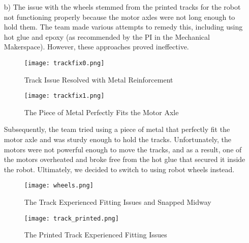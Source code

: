 \documentclass[12pt]{article}
\begin{document}
\begin{itemize}
\begin{itemize}
\begin{itemize}
\begin{enumerate}
                \item[b)] The issue with the wheels stemmed from the printed tracks for the robot not functioning properly because the motor axles were not long enough to hold them. The team made various attempts to remedy this, including using hot glue and epoxy (as recommended by the PI in the Mechanical Makerspace). However, these approaches proved ineffective.
                \begin{figure}[H]
                    \centering
                    \begin{minipage}[t]{0.45\textwidth}
                        \centering
                        \texttt{[image: trackfix0.png]}
                        \caption{Track Issue Resolved with Metal Reinforcement}
                        \label{fig:trackfix0}
                    \end{minipage}\hfill
                    \begin{minipage}[t]{0.45\textwidth}
                        \centering
                        \texttt{[image: trackfix1.png]}
                        \caption{The Piece of Metal Perfectly Fits the Motor Axle}
                        \label{fig:trackfix1}
                    \end{minipage}
                \end{figure}
                Subsequently, the team tried using a piece of metal that perfectly fit the motor axle and was sturdy enough to hold the tracks. Unfortunately, the motors were not powerful enough to move the tracks, and as a result, one of the motors overheated and broke free from the hot glue that secured it inside the robot. Ultimately, we decided to switch to using robot wheels instead.
                \begin{figure}[H]
                    \centering
                    \begin{minipage}[t]{0.45\textwidth}
                        \centering
                        \texttt{[image: wheels.png]}
                        \caption{The Track Experienced Fitting Issues and Snapped Midway}
                        \label{fig:trackfix0}
                    \end{minipage}\hfill
                    \begin{minipage}[t]{0.45\textwidth}
                        \centering
                        \texttt{[image: track\_printed.png]}
                        \caption{The Printed Track Experienced Fitting Issues}
                        \label{fig:trackfix1}
                    \end{minipage}
                \end{figure}
            \end{enumerate}
            

\end{itemize}
\end{itemize}
\end{itemize}
\end{document}
